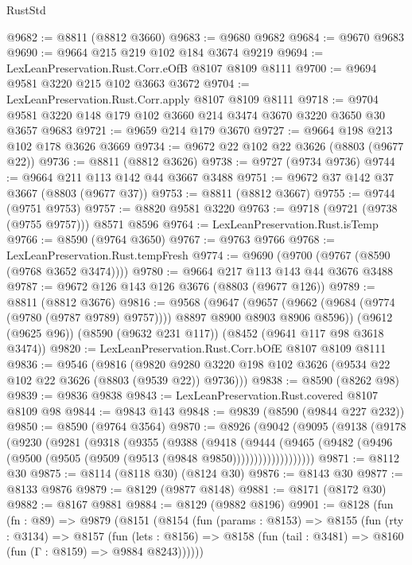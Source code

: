 \begin{lexlean}{RustStd}
\begin{coremodule}
@9682 := @8811 (@8812 @3660)
@9683 := @9680 @9682
@9684 := @9670 @9683
@9690 := @9664 @215 @219 @102 @184 @3674 @9219
@9694 := LexLeanPreservation.Rust.Corr.eOfB @8107 @8109 @8111
@9700 := @9694 @9581 @3220 @215 @102 @3663 @3672
@9704 := LexLeanPreservation.Rust.Corr.apply @8107 @8109 @8111
@9718 := @9704 @9581 @3220 @148 @179 @102 @3660 @214 @3474 @3670 @3220 @3650 @30 @3657 @9683
@9721 := @9659 @214 @179 @3670
@9727 := @9664 @198 @213 @102 @178 @3626 @3669
@9734 := @9672 @22 @102 @22 @3626 (@8803 (@9677 @22))
@9736 := @8811 (@8812 @3626)
@9738 := @9727 (@9734 @9736)
@9744 := @9664 @211 @113 @142 @44 @3667 @3488
@9751 := @9672 @37 @142 @37 @3667 (@8803 (@9677 @37))
@9753 := @8811 (@8812 @3667)
@9755 := @9744 (@9751 @9753)
@9757 := @8820 @9581 @3220
@9763 := @9718 (@9721 (@9738 (@9755 @9757))) @8571 @8596
@9764 := LexLeanPreservation.Rust.isTemp
@9766 := @8590 (@9764 @3650)
@9767 := @9763 @9766
@9768 := LexLeanPreservation.Rust.tempFresh
@9774 := @9690 (@9700 (@9767 (@8590 (@9768 @3652 @3474))))
@9780 := @9664 @217 @113 @143 @44 @3676 @3488
@9787 := @9672 @126 @143 @126 @3676 (@8803 (@9677 @126))
@9789 := @8811 (@8812 @3676)
@9816 := @9568
    (@9647
      (@9657 (@9662 (@9684 (@9774 (@9780 (@9787 @9789) @9757)))) @8897 @8900 @8903 @8906 @8596))
    (@9612 (@9625 @96))
    (@8590 (@9632 @231 @117))
    (@8452 (@9641 @117 @98 @3618 @3474))
@9820 := LexLeanPreservation.Rust.Corr.bOfE @8107 @8109 @8111
@9836 := @9546
    (@9816 (@9820 @9280 @3220 @198 @102 @3626 (@9534 @22 @102 @22 @3626 (@8803 (@9539 @22)) @9736)))
@9838 := @8590 (@8262 @98)
@9839 := @9836 @9838
@9843 := LexLeanPreservation.Rust.covered @8107 @8109 @98
@9844 := @9843 @143
@9848 := @9839 (@8590 (@9844 @227 @232))
@9850 := @8590 (@9764 @3564)
@9870 := @8926
    (@9042
      (@9095
        (@9138
          (@9178
            (@9230
              (@9281
                (@9318
                  (@9355
                    (@9388
                      (@9418
                        (@9444
                          (@9465
                            (@9482
                              (@9496 (@9500 (@9505 (@9509 (@9513 (@9848 @9850)))))))))))))))))))
@9871 := @8112 @30
@9875 := @8114 (@8118 @30) (@8124 @30)
@9876 := @8143 @30
@9877 := @8133 @9876
@9879 := @8129 (@9877 @8148)
@9881 := @8171 (@8172 @30)
@9882 := @8167 @9881
@9884 := @8129 (@9882 @8196)
@9901 := @8128
    (fun (fn : @89) =>
    @9879
      (@8151
        (@8154
          (fun (params : @8153) =>
          @8155
            (fun (rty : @3134) =>
            @8157
              (fun (lets : @8156) =>
              @8158 (fun (tail : @3481) => @8160 (fun (Γ : @8159) => @9884 @8243))))))

\end{coremodule}
\end{lexlean}
